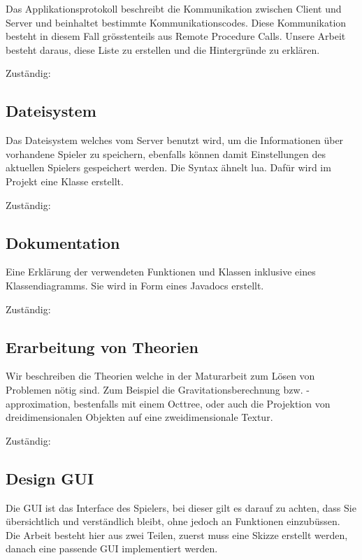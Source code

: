 \documentclass[a4paper]{article}
\begin{document}
Das Applikationsprotokoll beschreibt die Kommunikation zwischen Client und Server und beinhaltet bestimmte Kommunikationscodes. Diese Kommunikation besteht in diesem Fall grösstenteils aus Remote Procedure Calls. Unsere Arbeit besteht daraus, diese Liste zu erstellen und die Hintergründe zu erklären.

Zuständig: 

\subsection{Dateisystem}

Das Dateisystem welches vom Server benutzt wird, um die Informationen über vorhandene Spieler zu speichern, ebenfalls können damit Einstellungen des aktuellen Spielers gespeichert werden. Die Syntax ähnelt lua. Dafür wird im Projekt eine Klasse erstellt.

Zuständig: 

\subsection{Dokumentation}

Eine Erklärung der verwendeten Funktionen und Klassen inklusive eines Klassendiagramms. Sie wird in Form eines Javadocs erstellt.

Zuständig: 

\subsection{Erarbeitung von Theorien}

Wir beschreiben die Theorien welche in der Maturarbeit zum Lösen von Problemen nötig sind. Zum Beispiel die Gravitationsberechnung bzw. -approximation, bestenfalls mit einem Octtree, oder auch die Projektion von dreidimensionalen Objekten auf eine zweidimensionale Textur.

Zuständig: 

\subsection{Design GUI}
Die GUI ist das Interface des Spielers, bei dieser gilt es darauf zu achten, dass Sie übersichtlich und verständlich bleibt, ohne jedoch an Funktionen einzubüssen. Die Arbeit besteht hier aus zwei Teilen, zuerst muss eine Skizze erstellt werden, danach eine passende GUI implementiert werden.
\end{document}
